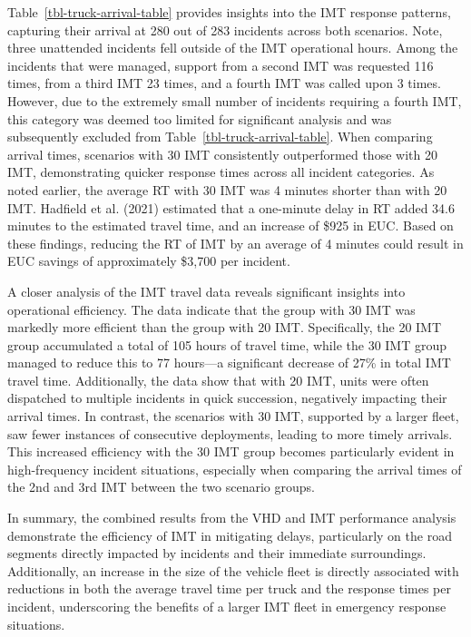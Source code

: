 \documentclass[fancy, oneside, mastersfancy, ms]{byuthesis}
\begin{document}
Table~\ref{tbl-truck-arrival-table} provides insights into the IMT
response patterns, capturing their arrival at 280 out of 283 incidents
across both scenarios. Note, three unattended incidents fell outside of
the IMT operational hours. Among the incidents that were managed,
support from a second IMT was requested 116 times, from a third IMT 23
times, and a fourth IMT was called upon 3 times. However, due to the
extremely small number of incidents requiring a fourth IMT, this
category was deemed too limited for significant analysis and was
subsequently excluded from Table~\ref{tbl-truck-arrival-table}. When
comparing arrival times, scenarios with 30 IMT consistently outperformed
those with 20 IMT, demonstrating quicker response times across all
incident categories. As noted earlier, the average RT with 30 IMT was 4
minutes shorter than with 20 IMT. Hadfield et al. (2021) estimated that
a one-minute delay in RT added 34.6 minutes to the estimated travel
time, and an increase of \$925 in EUC. Based on these findings, reducing
the RT of IMT by an average of 4 minutes could result in EUC savings of
approximately \$3,700 per incident.

A closer analysis of the IMT travel data reveals significant insights
into operational efficiency. The data indicate that the group with 30
IMT was markedly more efficient than the group with 20 IMT.
Specifically, the 20 IMT group accumulated a total of 105 hours of
travel time, while the 30 IMT group managed to reduce this to 77
hours---a significant decrease of 27\% in total IMT travel time.
Additionally, the data show that with 20 IMT, units were often
dispatched to multiple incidents in quick succession, negatively
impacting their arrival times. In contrast, the scenarios with 30 IMT,
supported by a larger fleet, saw fewer instances of consecutive
deployments, leading to more timely arrivals. This increased efficiency
with the 30 IMT group becomes particularly evident in high-frequency
incident situations, especially when comparing the arrival times of the
2nd and 3rd IMT between the two scenario groups.

In summary, the combined results from the VHD and IMT performance
analysis demonstrate the efficiency of IMT in mitigating delays,
particularly on the road segments directly impacted by incidents and
their immediate surroundings. Additionally, an increase in the size of
the vehicle fleet is directly associated with reductions in both the
average travel time per truck and the response times per incident,
underscoring the benefits of a larger IMT fleet in emergency response
situations.
\end{document}
